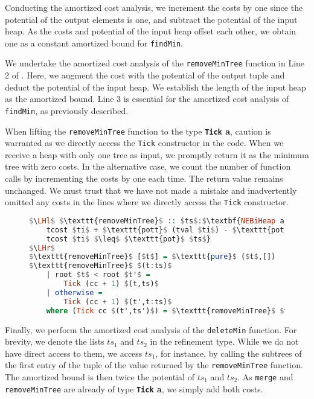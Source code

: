 \documentclass{clmthesis}
\begin{document}
Conducting the amortized cost analysis, we increment the costs by one since the potential of the output elements is one, and subtract the potential of the input heap. As the costs and potential of the input heap offset each other, we obtain one as a constant amortized bound for \texttt{findMin}.

We undertake the amortized cost analysis of the \texttt{removeMinTree} function in Line 2 of . Here, we augment the cost with the potential of the output tuple and deduct the potential of the input heap. We establish the length of the input heap as the amortized bound. Line 3 is essential for the amortized cost analysis of \texttt{findMin}, as previously described.

When lifting the \texttt{removeMinTree} function to the type \textbf{\lstinline{Tick} a}, caution is warranted as we directly access the \lstinline{Tick} constructor in the code. When we receive a heap with only one tree as input, we promptly return it as the minimum tree with zero costs. In the alternative case, we count the number of function calls by incrementing the costs by one each time. The return value remains unchanged. We must trust that we have not made a mistake and inadvertently omitted any costs in the lines where we directly access the \lstinline{Tick} constructor.

\begin{figure}[h]
\begin{lstlisting}[mathescape=true, language=haskell, caption={Amortized cost analysis of \texttt{removeMinTree}.},captionpos=b, label=fig:removeMinTreePot]
$\LHl$ $\texttt{removeMinTree}$ :: $ts$:$\textbf{NEBiHeap a}$ -> {$ti$:$\textbf{Tick}$ ($\textbf{BiTree a}$, $\textbf{BiHeap a}$) | 
	tcost $ti$ + $\texttt{pott}$ (tval $ti$) - $\texttt{pot}$ $ts$ $\leq$ $\texttt{pot}$ $ts$ &&
	tcost $ti$ $\leq$ $\texttt{pot}$ $ts$} 
$\LHr$
$\texttt{removeMinTree}$ [$t$] = $\texttt{pure}$ ($t$,[])
$\texttt{removeMinTree}$ $(t:ts)$
	| root $t$ < root $t'$ =
		Tick (cc + 1) $(t,ts)$
	| otherwise = 
		Tick (cc + 1) $(t',t:ts)$
	where (Tick cc $(t',ts')$) = $\texttt{removeMinTree}$ $ts$
\end{lstlisting}
\end{figure}
\FloatBarrier
Finally, we perform the amortized cost analysis of the \texttt{deleteMin} function. For brevity, we denote the lists $ts_1$ and $ts_2$ in the refinement type. While we do not have direct access to them, we access $ts_1$, for instance, by calling the subtrees of the first entry of the tuple of the value returned by the \texttt{removeMinTree} function. The amortized bound is then twice the potential of $ts_1$ and $ts_2$. As \texttt{merge} and \texttt{removeMinTree} are already of type \textbf{\lstinline{Tick} a}, we simply add both costs.
\end{document}
